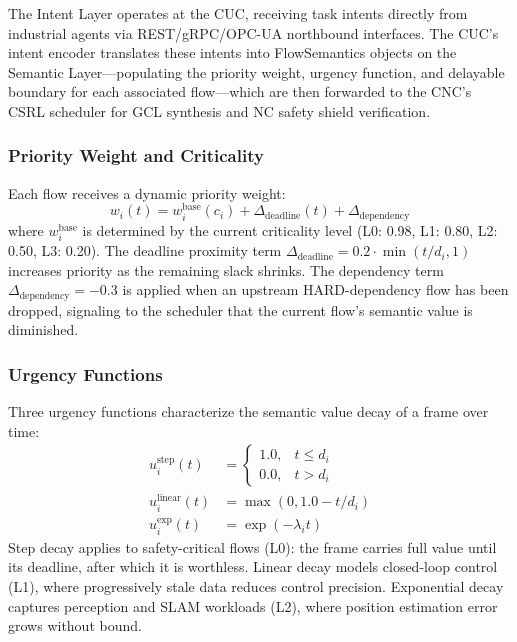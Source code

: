 \documentclass[conference]{IEEEtran}
\begin{document}
The Intent Layer operates at the CUC, receiving task intents directly from industrial agents via REST/gRPC/OPC-UA northbound interfaces. The CUC's intent encoder translates these intents into FlowSemantics objects on the Semantic Layer---populating the priority weight, urgency function, and delayable boundary for each associated flow---which are then forwarded to the CNC's CSRL scheduler for GCL synthesis and NC safety shield verification.

\subsubsection{Priority Weight and Criticality}

Each flow receives a dynamic priority weight:
\begin{equation}
w_i(t) = w_i^{\text{base}}(c_i) + \Delta_{\text{deadline}}(t) + \Delta_{\text{dependency}}
\end{equation}
where $w_i^{\text{base}}$ is determined by the current criticality level (L0: 0.98, L1: 0.80, L2: 0.50, L3: 0.20). The deadline proximity term $\Delta_{\text{deadline}} = 0.2 \cdot \min(t / d_i, 1)$ increases priority as the remaining slack shrinks. The dependency term $\Delta_{\text{dependency}} = -0.3$ is applied when an upstream HARD-dependency flow has been dropped, signaling to the scheduler that the current flow's semantic value is diminished.

\subsubsection{Urgency Functions}

Three urgency functions characterize the semantic value decay of a frame over time:
\begin{align}
u_i^{\text{step}}(t) &= \begin{cases} 1.0, & t \leq d_i \\ 0.0, & t > d_i \end{cases} \label{eq:urg_step} \\
u_i^{\text{linear}}(t) &= \max(0, 1.0 - t/d_i) \label{eq:urg_linear} \\
u_i^{\text{exp}}(t) &= \exp(-\lambda_i t) \label{eq:urg_exp}
\end{align}
Step decay applies to safety-critical flows (L0): the frame carries full value until its deadline, after which it is worthless. Linear decay models closed-loop control (L1), where progressively stale data reduces control precision. Exponential decay captures perception and SLAM workloads (L2), where position estimation error grows without bound.
\end{document}
